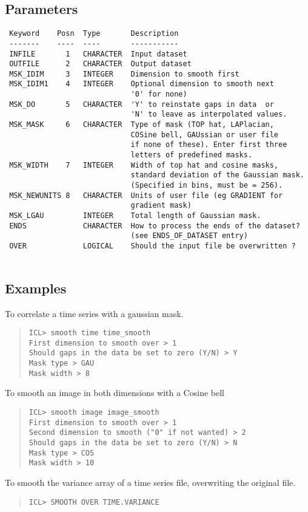 \documentclass{book}
\renewcommand{\_}{{\tt\char'137}}     %
\begin{document}
\subsection{Parameters}
\begin{verbatim}
 Keyword    Posn  Type       Description
 -------    ----  ----       -----------
 INFILE       1   CHARACTER  Input dataset
 OUTFILE      2   CHARACTER  Output dataset
 MSK_IDIM     3   INTEGER    Dimension to smooth first
 MSK_IDIM1    4   INTEGER    Optional dimension to smooth next
                             '0' for none)
 MSK_DO       5   CHARACTER  'Y' to reinstate gaps in data  or
                             'N' to leave as interpolated values.
 MSK_MASK     6   CHARACTER  Type of mask (TOP hat, LAPlacian,
                             COSine bell, GAUssian or user file
                             if none of these). Enter first three
                             letters of predefined masks.
 MSK_WIDTH    7   INTEGER    Width of top hat and cosine masks,
                             standard deviation of the Gaussian mask.
                             (Specified in bins, must be = 256).
 MSK_NEWUNITS 8   CHARACTER  Units of user file (eg GRADIENT for
                             gradient mask)
 MSK_LGAU         INTEGER    Total length of Gaussian mask.
 ENDS             CHARACTER  How to process the ends of the dataset?
                             (see ENDS_OF_DATASET entry)
 OVER             LOGICAL    Should the input file be overwritten ?
 
\end{verbatim}\subsection{Examples}
To correlate a time series with a gaussian mask.
\begin{quote}\begin{verbatim}
ICL> smooth time time_smooth
First dimension to smooth over > 1
Should gaps in the data be set to zero (Y/N) > Y
Mask type > GAU
Mask width > 8
\end{verbatim}\end{quote}
To smooth an image in both dimensions with a Cosine bell
\begin{quote}\begin{verbatim}
ICL> smooth image image_smooth
First dimension to smooth over > 1
Second dimension to smooth ("0" if not wanted) > 2
Should gaps in the data be set to zero (Y/N) > N
Mask type > COS
Mask width > 10
\end{verbatim}\end{quote}
To smooth the variance array of a time series file, overwriting
the original file.
\begin{quote}\begin{verbatim}
ICL> SMOOTH OVER TIME.VARIANCE
\end{verbatim}\end{quote}
\end{document}
